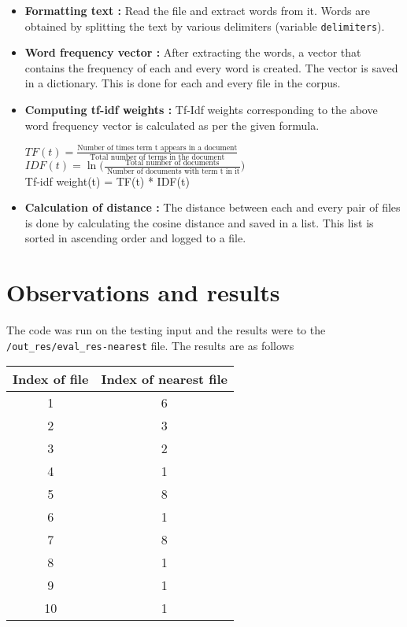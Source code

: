 \begin{itemize}
	\item \textbf{Formatting text :} Read the file and extract words from it. Words are obtained by splitting the text by various delimiters (variable \verb|delimiters|).
	\item \textbf{Word frequency vector :} After extracting the words, a vector that contains the frequency of each and every word is created. The vector is saved in a dictionary. This is done for each and every file in the corpus.
	\item \textbf{Computing tf-idf weights :} Tf-Idf weights corresponding to the above word frequency vector is calculated as per the given formula.
	\begin{center}
		$TF(t) = \frac{\text{Number of times term t appears in a document}}{\text{Total number of terms in the document}}$\\ 
		\vspace{1.2em}
		$IDF(t) = \ln \big( {\frac{\text{Total number of documents}}{\text{ Number of documents with term t in it}}} \big) $\\
		\vspace{1.2em}
		Tf-idf weight(t) = TF(t) * IDF(t)
	\end{center}
	\item \textbf{Calculation of distance :} The distance between each and every pair of files is done by calculating the cosine distance and saved in a list. This list is sorted in ascending order and logged to a file. 
\end{itemize}

\section{Observations and results}
\label{sec:p01}

The code was run on the testing input and the results were to the \verb|/out_res/eval_res-nearest| file. The results are as follows \\


\begin{center}
	\begin{tabular}{ |c| c| }
		\hline
		Index of file & Index of nearest file  \\ 
		\hline
		1 & 6 \\
		2 & 3\\
		3 & 2\\
		4 & 1\\
		5 & 8\\
		6 & 1\\
		7 & 8\\
		8 & 1  \\ 
		9 & 1\\
		10 & 1 \\ 
		\hline
	\end{tabular}
\end{center}




